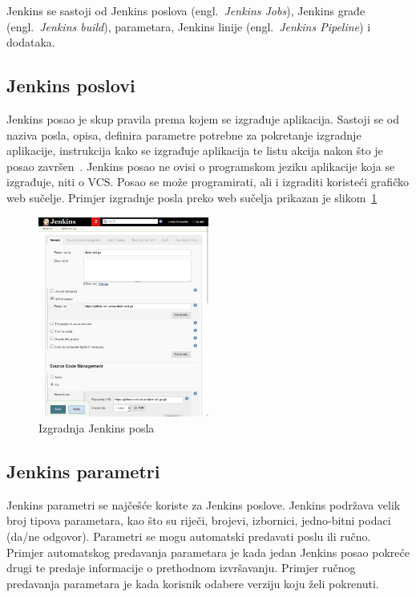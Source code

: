 Jenkins se sastoji od Jenkins poslova (engl.~\textit{Jenkins Jobs}), Jenkins građe
(engl.~\textit{Jenkins build}), %
parametara, Jenkins linije (engl.~\textit{Jenkins Pipeline}) i dodataka.

\subsection{Jenkins poslovi}
Jenkins posao je skup pravila prema kojem se izgrađuje aplikacija. Sastoji se od naziva posla,
opisa, definira parametre potrebne za pokretanje izgradnje aplikacije, instrukcija kako se izgrađuje
aplikacija te listu akcija nakon što je posao završen~\citep{pathania2016learning}. Jenkins posao ne
ovisi o programskom jeziku aplikacije koja se izgrađuje, niti o VCS. Posao se može programirati, ali
i izgraditi koristeći grafičko web sučelje. Primjer izgradnje posla preko web sučelja prikazan je
slikom~\ref{fig:02jenkinsjob}

\begin{figure}
    \centering
    \includegraphics[width=0.5\textwidth]{img/02/jenkins_job.png}
    \caption{Izgradnja Jenkins posla}%
    \label{fig:02jenkinsjob}
\end{figure}

\subsection{Jenkins parametri}
Jenkins parametri se najčešće koriste za Jenkins poslove. Jenkins podržava velik broj tipova
parametara, kao što su riječi, brojevi, izbornici, jedno-bitni podaci (da/ne odgovor). Parametri se
mogu automatski predavati poslu ili ručno. Primjer automatskog predavanja parametara je kada jedan
Jenkins posao pokreće drugi te predaje informacije o prethodnom izvršavanju. Primjer ručnog
predavanja parametara je kada korisnik odabere verziju koju želi pokrenuti.

